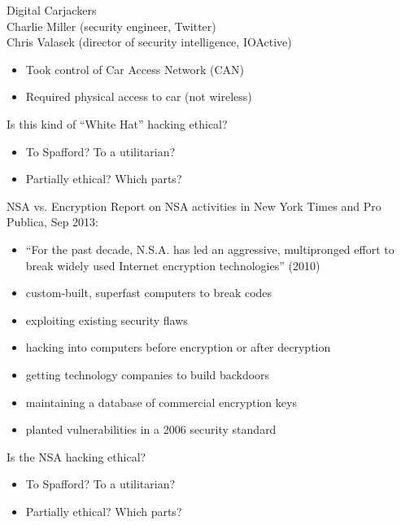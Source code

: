 \documentclass{beamer}
\begin{document}
\begin{frame}{Digital Carjackers}
\href{https://www.youtube.com/watch?v=oqe6S6m73Zw}{} \\
\bigskip
Charlie Miller (security engineer, Twitter) \\
Chris Valasek (director of security intelligence, IOActive)
\begin{itemize}
\item Took control of Car Access Network (CAN)
\item Required physical access to car (not wireless)
\end{itemize}
\pause
\bigskip
Is this kind of ``White Hat'' hacking ethical?
\begin{itemize}
\item To Spafford? To a utilitarian?
\item Partially ethical? Which parts?
\end{itemize}
\end{frame}

\begin{frame}{NSA vs. Encryption}
Report on NSA activities in New York Times and Pro Publica, Sep 2013:
\begin{itemize}
\item ``For the past decade, N.S.A. has led an aggressive, multipronged effort to break widely used Internet encryption technologies'' (2010)
\item custom-built, superfast computers to break codes
\item exploiting existing security flaws
\item hacking into computers before encryption or after decryption
\item getting technology companies to build backdoors
\item maintaining a database of commercial encryption keys
\item planted vulnerabilities in a 2006 security standard
\end{itemize}
\bigskip
Is the NSA hacking ethical?
\begin{itemize}
\item To Spafford? To a utilitarian?
\item Partially ethical? Which parts?
\end{itemize}
\end{frame}
\end{document}
